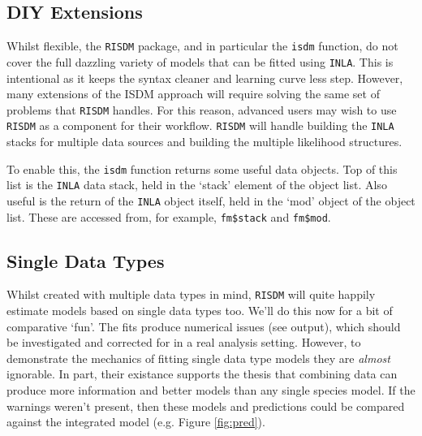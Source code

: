 \documentclass[article,shortnames,nojss]{jss}\usepackage[]{graphicx}\usepackage[]{xcolor}
\begin{document}
\subsection*{DIY Extensions}

Whilst flexible, the \texttt{RISDM} package, and in particular the \texttt{isdm} function, do not cover the full dazzling variety of models that can be fitted using \texttt{INLA}. This is intentional as it keeps the syntax cleaner and learning curve less step. However, many extensions of the ISDM approach will require solving the same set of problems that \texttt{RISDM} handles. For this reason, advanced users may wish to use \texttt{RISDM} as a component for their workflow. \texttt{RISDM} will handle building the \texttt{INLA} stacks for multiple data sources and building the multiple likelihood structures.

To enable this, the \texttt{isdm} function returns some useful data objects. Top of this list is the \texttt{INLA} data stack, held in the `stack' element of the object list. Also useful is the return of the \texttt{INLA} object itself, held in the `mod' object of the object list. These are accessed from, for example, \texttt{fm\$stack} and \texttt{fm\$mod}.

\subsection*{Single Data Types}

Whilst created with multiple data types in mind, \texttt{RISDM} will quite happily estimate models based on single data types too. We'll do this now for a bit of comparative `fun'. The fits produce numerical issues (see output), which should be investigated and corrected for in a real analysis setting. However, to demonstrate the mechanics of fitting single data type models they are \textit{almost} ignorable. In part, their existance supports the thesis that combining data can produce more information and better models than any single species model. If the warnings weren't present, then these models and predictions could be compared against the integrated model (e.g. Figure \ref{fig:pred}).
\end{document}
